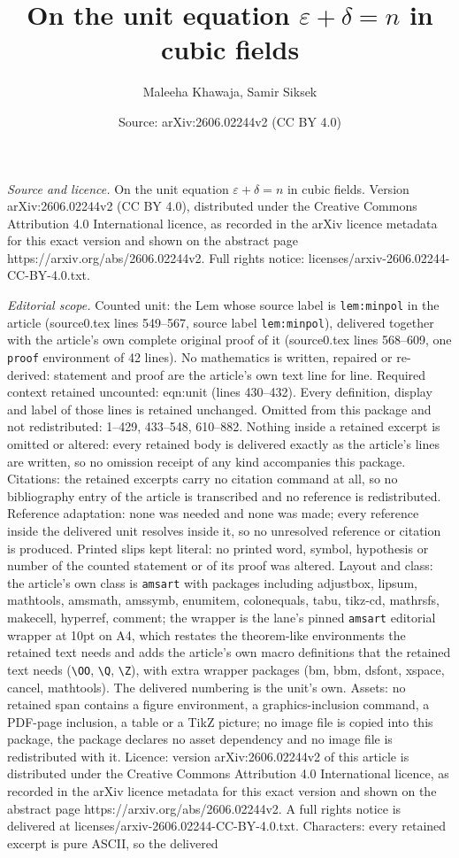 \documentclass[10pt,a4paper]{amsart}
\title[On the unit equation $\varepsilon+\delta=n$ in cubic fields]{On the unit equation $\varepsilon+\delta=n$ in cubic fields}
\author{Maleeha Khawaja, Samir Siksek}
\date{Source: arXiv:2606.02244v2 (CC BY 4.0)}
\begin{document}
\maketitle

\noindent\emph{Source and licence.} On the unit equation $\varepsilon+\delta=n$ in cubic fields. Version arXiv:2606.02244v2 (CC BY 4.0), distributed under the Creative Commons Attribution 4.0 International licence, as recorded in the arXiv licence metadata for this exact version and shown on the abstract page https://arxiv.org/abs/2606.02244v2. Full rights notice: licenses/arxiv-2606.02244-CC-BY-4.0.txt.\par\smallskip

\noindent\textit{Editorial scope.} Counted unit: the Lem whose source label is \texttt{lem:minpol} in the article (source0.tex lines 549--567, source label \texttt{lem:minpol}), delivered together with the article's own complete original proof of it (source0.tex lines 568--609, one \texttt{proof} environment of 42 lines). No mathematics is written, repaired or re-derived: statement and proof are the article's own text line for line. Required context retained uncounted: eqn:unit (lines 430--432). Every definition, display and label of those lines is retained unchanged. Omitted from this package and not redistributed: 1--429, 433--548, 610--882. Nothing inside a retained excerpt is omitted or altered: every retained body is delivered exactly as the article's lines are written, so no omission receipt of any kind accompanies this package. Citations: the retained excerpts carry no citation command at all, so no bibliography entry of the article is transcribed and no reference is redistributed. Reference adaptation: none was needed and none was made; every reference inside the delivered unit resolves inside it, so no unresolved reference or citation is produced. Printed slips kept literal: no printed word, symbol, hypothesis or number of the counted statement or of its proof was altered. Layout and class: the article's own class is \texttt{amsart} with packages including adjustbox, lipsum, mathtools, amsmath, amssymb, enumitem, colonequals, tabu, tikz-cd, mathrsfs, makecell, hyperref, comment; the wrapper is the lane's pinned \texttt{amsart} editorial wrapper at 10pt on A4, which restates the theorem-like environments the retained text needs and adds the article's own macro definitions that the retained text needs (\texttt{\textbackslash OO}, \texttt{\textbackslash Q}, \texttt{\textbackslash Z}), with extra wrapper packages (bm, bbm, dsfont, xspace, cancel, mathtools). The delivered numbering is the unit's own. Assets: no retained span contains a figure environment, a graphics-inclusion command, a PDF-page inclusion, a table or a TikZ picture; no image file is copied into this package, the package declares no asset dependency and no image file is redistributed with it. Licence: version arXiv:2606.02244v2 of this article is distributed under the Creative Commons Attribution 4.0 International licence, as recorded in the arXiv licence metadata for this exact version and shown on the abstract page https://arxiv.org/abs/2606.02244v2. A full rights notice is delivered at licenses/arxiv-2606.02244-CC-BY-4.0.txt. Characters: every retained excerpt is pure ASCII, so the delivered 
\end{document}
